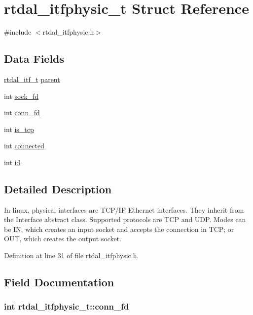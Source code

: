 \hypertarget{structrtdal__itfphysic__t}{\section{rtdal\-\_\-itfphysic\-\_\-t Struct Reference}
\label{structrtdal__itfphysic__t}
}


{\ttfamily \#include $<$rtdal\-\_\-itfphysic.\-h$>$}

\subsection*{Data Fields}
\begin{DoxyCompactItemize}
\item 
\hyperlink{structrtdal__itf__t}{rtdal\-\_\-itf\-\_\-t} \hyperlink{structrtdal__itfphysic__t_a070c6f1daf71d41c5871fdb4bd81c124}{parent}
\item 
int \hyperlink{structrtdal__itfphysic__t_a317608cf9f44fca72c5488b37472c0e7}{sock\-\_\-fd}
\item 
int \hyperlink{structrtdal__itfphysic__t_a1a82ebdc90895ab772a93103b7a6940e}{conn\-\_\-fd}
\item 
int \hyperlink{structrtdal__itfphysic__t_a515a63500d305554230d7c9abde3d03f}{is\-\_\-tcp}
\item 
int \hyperlink{structrtdal__itfphysic__t_a08ddbccdcb13151090301cc74c26c7f6}{connected}
\item 
int \hyperlink{structrtdal__itfphysic__t_a970c448897d32b96adb1eba461dda7f6}{id}
\end{DoxyCompactItemize}


\subsection{Detailed Description}
In linux, physical interfaces are T\-C\-P/\-I\-P Ethernet interfaces. They inherit from the Interface abstract class. Supported protocols are T\-C\-P and U\-D\-P. Modes can be I\-N, which creates an input socket and accepts the connection in T\-C\-P; or O\-U\-T, which creates the output socket. 

Definition at line 31 of file rtdal\-\_\-itfphysic.\-h.



\subsection{Field Documentation}
\hypertarget{structrtdal__itfphysic__t_a1a82ebdc90895ab772a93103b7a6940e}{
\subsubsection[{conn\-\_\-fd}]{\setlength{\rightskip}{0pt plus 5cm}int rtdal\-\_\-itfphysic\-\_\-t\-::conn\-\_\-fd}}\label{structrtdal__itfphysic__t_a1a82ebdc90895ab772a93103b7a6940e}



